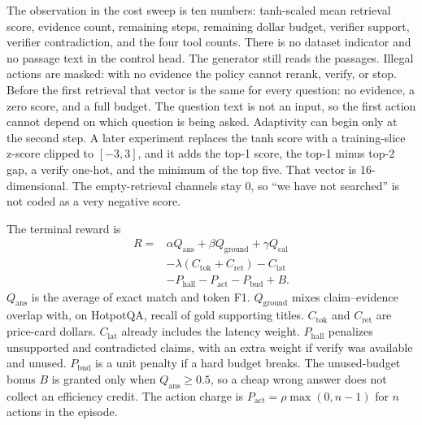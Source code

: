 \documentclass[letterpaper]{article} %
\begin{document}
The observation in the cost sweep is ten numbers: tanh-scaled mean retrieval score, evidence count, remaining steps, remaining dollar budget, verifier support, verifier contradiction, and the four tool counts. There is no dataset indicator and no passage text in the control head. The generator still reads the passages. Illegal actions are masked: with no evidence the policy cannot rerank, verify, or stop. Before the first retrieval that vector is the same for every question: no evidence, a zero score, and a full budget. The question text is not an input, so the first action cannot depend on which question is being asked. Adaptivity can begin only at the second step. A later experiment replaces the tanh score with a training-slice z-score clipped to \([-3, 3]\), and it adds the top-1 score, the top-1 minus top-2 gap, a verify one-hot, and the minimum of the top five. That vector is 16-dimensional. The empty-retrieval channels stay 0, so ``we have not searched'' is not coded as a very negative score.

The terminal reward is
\begin{equation}
\begin{aligned}
R = {} & \alpha Q_{\mathrm{ans}} + \beta Q_{\mathrm{ground}} + \gamma Q_{\mathrm{cal}} \\
& - \lambda (C_{\mathrm{tok}} + C_{\mathrm{ret}}) - C_{\mathrm{lat}} \\
& - P_{\mathrm{hall}} - P_{\mathrm{act}} - P_{\mathrm{bud}} + B.
\end{aligned}
\label{eq:reward}
\end{equation}
\(Q_{\mathrm{ans}}\) is the average of exact match and token F1. \(Q_{\mathrm{ground}}\) mixes claim--evidence overlap with, on HotpotQA, recall of gold supporting titles. \(C_{\mathrm{tok}}\) and \(C_{\mathrm{ret}}\) are price-card dollars. \(C_{\mathrm{lat}}\) already includes the latency weight. \(P_{\mathrm{hall}}\) penalizes unsupported and contradicted claims, with an extra weight if verify was available and unused. \(P_{\mathrm{bud}}\) is a unit penalty if a hard budget breaks. The unused-budget bonus \(B\) is granted only when \(Q_{\mathrm{ans}} \ge 0.5\), so a cheap wrong answer does not collect an efficiency credit. The action charge is \(P_{\mathrm{act}} = \rho \max(0, n-1)\) for \(n\) actions in the episode.
\end{document}
